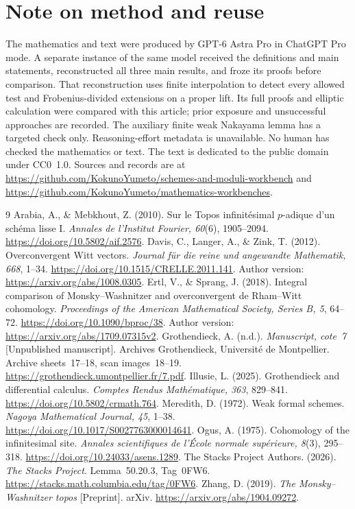 \documentclass[11pt]{article}
\newcommand{\workbenchurl}{https://github.com/KokunoYumeto/schemes-and-moduli-workbench}
\newcommand{\recordurl}{https://github.com/KokunoYumeto/mathematics-workbenches}
\theoremstyle{definition}\newtheorem{definition}[theorem]{Definition}
\theoremstyle{remark}\newtheorem{remark}[theorem]{Remark}
\begin{document}
\section*{Note on method and reuse}

The mathematics and text were produced by GPT-6 Astra Pro in ChatGPT Pro mode. A separate instance of the same model received the definitions and main statements, reconstructed all three main results, and froze its proofs before comparison. That reconstruction uses finite interpolation to detect every allowed test and Frobenius-divided extensions on a proper lift. Its full proofs and elliptic calculation were compared with this article; prior exposure and unsuccessful approaches are recorded. The auxiliary finite weak Nakayama lemma has a targeted check only. Reasoning-effort metadata is unavailable. No human has checked the mathematics or text. The text is dedicated to the public domain under CC0~1.0. Sources and records are at \url{\workbenchurl} and \url{\recordurl}.

\small
\begin{thebibliography}{9}
Arabia, A., \& Mebkhout, Z. (2010). Sur le Topos infinit\'esimal $p$-adique d'un sch\'ema lisse I. \emph{Annales de l'Institut Fourier, 60}(6), 1905--2094. \url{https://doi.org/10.5802/aif.2576}.
Davis, C., Langer, A., \& Zink, T. (2012). Overconvergent Witt vectors. \emph{Journal f\"ur die reine und angewandte Mathematik, 668}, 1--34. \url{https://doi.org/10.1515/CRELLE.2011.141}. Author version: \url{https://arxiv.org/abs/1008.0305}.
Ertl, V., \& Sprang, J. (2018). Integral comparison of Monsky--Washnitzer and overconvergent de Rham--Witt cohomology. \emph{Proceedings of the American Mathematical Society, Series B, 5}, 64--72. \url{https://doi.org/10.1090/bproc/38}. Author version: \url{https://arxiv.org/abs/1709.07315v2}.
Grothendieck, A. (n.d.). \emph{Manuscript, cote~7} [Unpublished manuscript]. Archives Grothendieck, Universit\'e de Montpellier. Archive sheets~17--18, scan images~18--19. \url{https://grothendieck.umontpellier.fr/7.pdf}.
Illusie, L. (2025). Grothendieck and differential calculus. \emph{Comptes Rendus Math\'ematique, 363}, 829--841. \url{https://doi.org/10.5802/crmath.764}.
Meredith, D. (1972). Weak formal schemes. \emph{Nagoya Mathematical Journal, 45}, 1--38. \url{https://doi.org/10.1017/S0027763000014641}.
Ogus, A. (1975). Cohomology of the infinitesimal site. \emph{Annales scientifiques de l'\'Ecole normale sup\'erieure, 8}(3), 295--318. \url{https://doi.org/10.24033/asens.1289}.
The Stacks Project Authors. (2026). \emph{The Stacks Project}. Lemma~50.20.3, Tag~0FW6. \url{https://stacks.math.columbia.edu/tag/0FW6}.
Zhang, D. (2019). \emph{The Monsky--Washnitzer topos} [Preprint]. arXiv. \url{https://arxiv.org/abs/1904.09272}.
\end{thebibliography}
\end{document}
